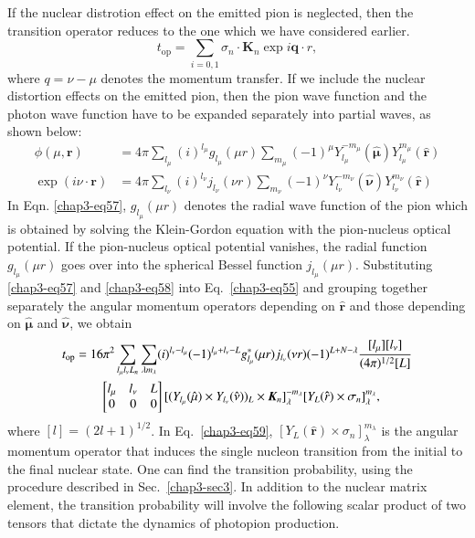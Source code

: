 If the nuclear distrotion effect on the emitted pion is neglected, then the transition operator reduces to the one which we have considered earlier.
\begin{equation}
t_{\text{op}} = \sum_{i=0, 1} \sigma_n \cdot {\boldsymbol K}_n \exp i {\boldsymbol q \cdot r}, \label{chap3-eq56}
\end{equation}
where $q= \nu -\mu$ denotes the momentum transfer. If we include the nuclear distortion effects on the emitted pion, then the pion wave function and the photon wave function have to be expanded separately into partial waves, as shown below:
\begin{align}
  \phi (\mu , {\boldsymbol r}) & = 4 \pi \sum_{l_{\mu}} (i)^{l_\mu} g_{l_\mu}(\mu r)\sum_{m_\mu} (-1)^\mu Y_{l_\mu}^{-m _\mu} ({\boldsymbol \hat{\mu}}) Y_{l_\mu}^{m_\mu} ({\boldsymbol \hat{r}}) \label{chap3-eq57}\\
  \exp (i \nu \cdot {\boldsymbol r}) & = 4 \pi \sum_{l_\nu} (i)^{l_\nu} j_{l_\nu} (\nu r) \sum_{m_\nu} (-1)^\nu Y_{l_\nu}^{-m_\nu} ({\boldsymbol \hat{\nu}}) Y_{l_\nu}^{m_\nu} ({\boldsymbol \hat{r}}) \label{chap3-eq58}
\end{align}
In Eqn. \eqref{chap3-eq57}, $g_{l_\mu} (\mu r)$ denotes the radial wave function of the pion which is obtained by solving the Klein-Gordon equation with the pion-nucleus optical potential. If the pion-nucleus optical potential vanishes, the radial function $g_{l_\mu}(\mu r)$ goes over into the spherical Bessel function  $j_{l_\mu}(\mu r)$. Substituting \eqref{chap3-eq57} and \eqref{chap3-eq58} into Eq.~\eqref{chap3-eq55} and grouping together separately the angular momentum operators depending on ${\boldsymbol \hat{r}}$ and those depending on ${\boldsymbol \hat{\mu}}$ and ${\boldsymbol \hat{\nu}}$, we obtain
\begin{align}
  t_{\text{op}} & = 16\pi^2 \sum_{l_\mu l_\nu L_n} \sum_{\lambda m_\lambda} (i)^{l_\nu - l_\mu} (-1)^{l_\mu + l_\nu - L} g_{l_\mu}^\ast (\mu r)j_{l_\nu} (\nu r) (-1)^{L+N-\lambda} \frac{[l_\mu][l_\nu]}{(4 \pi)^{1/2}[L]}\notag\\
  & \qquad \begin{bmatrix} l_\mu & l_\nu & L\\ 0 & 0 & 0   \end{bmatrix} [(Y_{l_\mu}(\hat{\mu}) \times Y_{l_\nu} (\hat{\nu}))_L \times {\boldsymbol K}_n]_\lambda^{-m_\lambda} [Y_L ({\boldsymbol \hat{r}}) \times \sigma_n]_{\lambda}^{m_\lambda}, \label{chap3-eq59}
\end{align}
where $[l] = (2l+1)^{1/2}$. In Eq.\ \eqref{chap3-eq59}, $[Y_L ({\boldsymbol \hat{r}}) \times \sigma_n]_\lambda^{m_\lambda}$ is the angular momentum operator that induces the single nucleon transition from the initial to the final nuclear state. One can find the transition probability, using the procedure described in Sec.\ \ref{chap3-sec3}. In addition to the nuclear matrix element, the transition probability will involve the following scalar product of two tensors that dictate the dynamics of photopion production.
